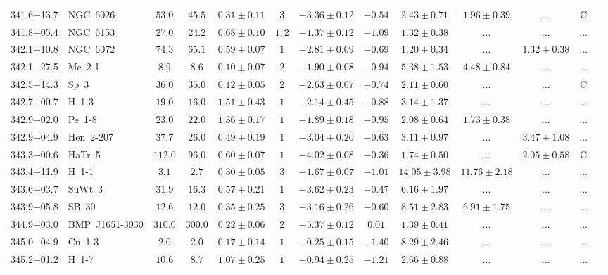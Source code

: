\documentclass[useAMS]{mn2e}
\begin{document}
\begin{center}
{\begin{longtable}{llccccccccccc}
341.6$+$13.7&NGC~6026&$      53.0$&$      45.5$&$0.31 \pm 0.11$&$3$&$-3.36 \pm 0.12$&$     -0.54$&$2.43 \pm 0.71$&$1.96 \pm 0.39$&$...$&C\\
341.8$+$05.4&NGC~6153&$      27.0$&$      24.2$&$0.68 \pm 0.10$&$1,2$&$-1.37 \pm 0.12$&$     -1.09$&$1.32 \pm 0.38$&$...$&$...$&...\\
342.1$+$10.8&NGC~6072&$      74.3$&$      65.1$&$0.59 \pm 0.07$&$1$&$-2.81 \pm 0.09$&$     -0.69$&$1.20 \pm 0.34$&$...$&$1.32 \pm 0.38$&...\\
342.1$+$27.5&Me~2-1&$       8.9$&$       8.6$&$0.10 \pm 0.07$&$2$&$-1.90 \pm 0.08$&$     -0.94$&$5.38 \pm 1.53$&$4.48 \pm 0.84$&$...$&...\\
342.5$-$14.3&Sp~3&$      36.0$&$      35.0$&$0.12 \pm 0.05$&$2$&$-2.63 \pm 0.07$&$     -0.74$&$2.11 \pm 0.60$&$...$&$...$&C\\
342.7$+$00.7&H~1-3&$      19.0$&$      16.0$&$1.51 \pm 0.43$&$1$&$-2.14 \pm 0.45$&$     -0.88$&$3.14 \pm 1.37$&$...$&$...$&...\\
342.9$-$02.0&Pe~1-8&$      23.0$&$      22.0$&$1.36 \pm 0.17$&$1$&$-1.89 \pm 0.18$&$     -0.95$&$2.08 \pm 0.64$&$1.73 \pm 0.38$&$...$&...\\
342.9$-$04.9&Hen~2-207&$      37.7$&$      26.0$&$0.49 \pm 0.19$&$1$&$-3.04 \pm 0.20$&$     -0.63$&$3.11 \pm 0.97$&$...$&$3.47 \pm 1.08$&...\\
343.3$-$00.6&HaTr~5&$     112.0$&$      96.0$&$0.60 \pm 0.07$&$1$&$-4.02 \pm 0.08$&$     -0.36$&$1.74 \pm 0.50$&$...$&$2.05 \pm 0.58$&C\\
343.4$+$11.9&H~1-1&$       3.1$&$       2.7$&$0.30 \pm 0.05$&$3$&$-1.67 \pm 0.07$&$     -1.01$&$14.05 \pm 3.98$&$11.76 \pm 2.18$&$...$&...\\
343.6$+$03.7&SuWt~3&$      31.9$&$      16.3$&$0.57 \pm 0.21$&$1$&$-3.62 \pm 0.23$&$     -0.47$&$6.16 \pm 1.97$&$...$&$...$&...\\
343.9$-$05.8&SB~30&$      12.6$&$      12.0$&$0.35 \pm 0.25$&$3$&$-3.16 \pm 0.26$&$     -0.60$&$8.51 \pm 2.83$&$6.91 \pm 1.75$&$...$&...\\
344.9$+$03.0&BMP~J1651-3930&$     310.0$&$     300.0$&$0.22 \pm 0.06$&$2$&$-5.37 \pm 0.12$&$      0.01$&$1.39 \pm 0.41$&$...$&$...$&...\\
345.0$-$04.9&Cn~1-3&$       2.0$&$       2.0$&$0.17 \pm 0.14$&$1$&$-0.25 \pm 0.15$&$     -1.40$&$8.29 \pm 2.46$&$...$&$...$&...\\
345.2$-$01.2&H~1-7&$      10.6$&$       8.7$&$1.07 \pm 0.25$&$1$&$-0.94 \pm 0.25$&$     -1.21$&$2.66 \pm 0.88$&$...$&$...$&...\\

\end{longtable}}
\end{center}
\end{document}
